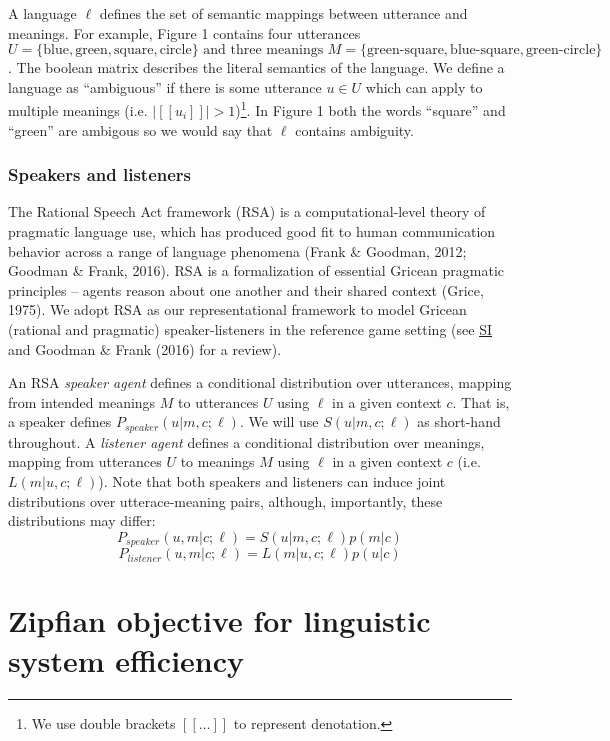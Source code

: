 \documentclass[10pt, letterpaper]{article}
\begin{document}
A language \(\ell\) defines the set of semantic mappings between
utterance and meanings. For example, Figure 1 contains four utterances
\(U = \{\text{blue}, \text{green}, \text{square}, \text{circle}\} \text{ and three meanings }M = \{\text{green-square}, \text{blue-square}, \text{green-circle}\}\).
The boolean matrix describes the literal semantics of the language. We
define a language as ``ambiguous'' if there is some utterance
\(u \in U\) which can apply to multiple meanings (i.e.
\(|[[u_i]]| > 1\))\footnote{We use double brackets $[[\dots]]$ to represent denotation.}.
In Figure 1 both the words ``square'' and ``green'' are ambigous so we
would say that \(\ell\) contains ambiguity.

\subsubsection{Speakers and listeners}\label{speakers-and-listeners}

The Rational Speech Act framework (RSA) is a computational-level theory
of pragmatic language use, which has produced good fit to human
communication behavior across a range of language phenomena (Frank \&
Goodman, 2012; Goodman \& Frank, 2016). RSA is a formalization of
essential Gricean pragmatic principles -- agents reason about one
another and their shared context (Grice, 1975). We adopt RSA as our
representational framework to model Gricean (rational and pragmatic)
speaker-listeners in the reference game setting (see
\href{https://github.com/benpeloquin7/zipf_principles/blob/master/paper/supplementary_materials.pdf}{SI}
and Goodman \& Frank (2016) for a review).\par

An RSA \emph{speaker agent} defines a conditional distribution over
utterances, mapping from intended meanings \(M\) to utterances \(U\)
using \(\ell\) in a given context \(c\). That is, a speaker defines
\(P_{speaker}(u|m, c; \ell)\). We will use \(S(u|m, c; \ell)\) as
short-hand throughout. A \emph{listener agent} defines a conditional
distribution over meanings, mapping from utterances \(U\) to meanings
\(M\) using \(\ell\) in a given context \(c\) (i.e. \(L(m|u, c;\ell)\)).
Note that both speakers and listeners can induce joint distributions
over utterace-meaning pairs, although, importantly, these distributions
may differ: \[P_{speaker}(u, m | c; \ell) = S(u|m, c; \ell)p(m|c)\]
\[P_{listener}(u, m| c; \ell) = L(m|u, c; \ell)p(u|c)\]

\section{Zipfian objective for linguistic system
efficiency}\label{zipfian-objective-for-linguistic-system-efficiency}
\end{document}
